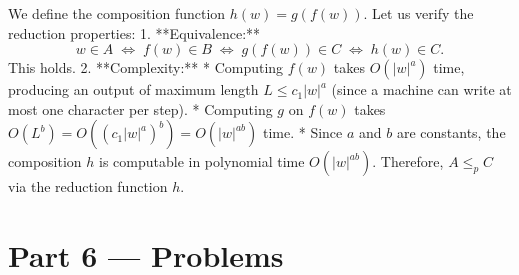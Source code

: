 \documentclass[12pt, a4paper]{book}
\begin{document}
\begin{problembox}
\begin{enumerate}[label=\textbf{E\arabic*.}]
        We define the composition function $h(w) = g(f(w))$.
        Let us verify the reduction properties:
        1. **Equivalence:**
           \[
             w \in A \;\iff\; f(w) \in B \;\iff\; g(f(w)) \in C \;\iff\; h(w) \in C.
           \]
           This holds.
        2. **Complexity:**
           * Computing $f(w)$ takes $O(|w|^a)$ time, producing an output of maximum length $L \le c_1 |w|^a$ (since a machine can write at most one character per step).
           * Computing $g$ on $f(w)$ takes $O(L^b) = O((c_1 |w|^a)^b) = O(|w|^{ab})$ time.
           * Since $a$ and $b$ are constants, the composition $h$ is computable in polynomial time $O(|w|^{ab})$.
        Therefore, $A \le_p C$ via the reduction function $h$.
\end{enumerate}
\end{problembox}

\newpage

\section{Part 6 --- Problems}
\end{document}
